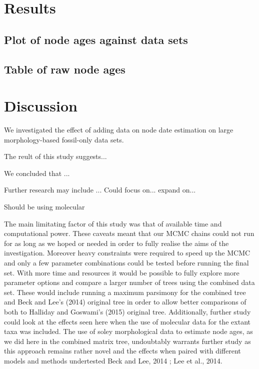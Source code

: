 \documentclass[11pt,letterpaper]{article}
\begin{document}
\section{Results} 

\subsection*{Plot of node ages against data sets}


\subsection*{Table of raw node ages}


\section*{Discussion}

We investigated the effect of adding data on node date estimation on large morphology-based fossil-only data sets.

The reult of this study suggests...

We concluded that ...

Further research may include ... Could focus on... expand on...

Should be using molecular \citep{puttick2016dating} 

The main limitating factor of this study was that of available time and computational power. These caveats meant that our MCMC chains could not run for as long as we hoped or needed in order to fully realise the aims of the investigation. Moreover heavy constraints were required to speed up the MCMC and only a few parameter combinations could be tested before running the final set. With more time and resources it would be possible to fully explore more parameter options and compare a larger number of trees using the combined data set. These would include running a maximum parsimony for the combined tree and Beck and Lee's (2014) original tree in order to allow better comparisons of both to Halliday and Goswami's (2015) original tree. Additionally, further study could look at the effects seen here when the use of molecular data for the extant taxa was included. The use of soley morphological data to estimate node ages, as we did here in the combined matrix tree, undoubtably warrants further study as this approach remains rather novel and the effects when paired with different models and methods undertested Beck and Lee, 2014 ;  Lee et al., 2014. 
\end{document}
